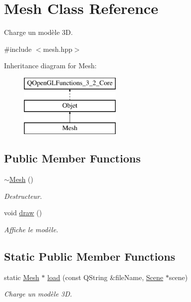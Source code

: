 \hypertarget{class_mesh}{\section{Mesh Class Reference}
\label{class_mesh}
}


Charge un modèle 3\+D.  




{\ttfamily \#include $<$mesh.\+hpp$>$}

Inheritance diagram for Mesh\+:\begin{figure}[H]
\begin{center}
\leavevmode
\includegraphics[height=3.000000cm]{class_mesh}
\end{center}
\end{figure}
\subsection*{Public Member Functions}
\begin{DoxyCompactItemize}
\item 
\hyperlink{class_mesh_a5efe4da1a4c0971cfb037bd70304c303}{$\sim$\+Mesh} ()
\begin{DoxyCompactList}\small\item\em Destructeur. \end{DoxyCompactList}\item 
void \hyperlink{class_mesh_a996a8668fa2ca7d95d6d10744c833bc8}{draw} ()
\begin{DoxyCompactList}\small\item\em Affiche le modèle. \end{DoxyCompactList}\end{DoxyCompactItemize}
\subsection*{Static Public Member Functions}
\begin{DoxyCompactItemize}
\item 
static \hyperlink{class_mesh}{Mesh} $\ast$ \hyperlink{class_mesh_ab930df3a124420d74b954948bb6bfbec}{load} (const Q\+String \&file\+Name, \hyperlink{class_scene}{Scene} $\ast$scene)
\begin{DoxyCompactList}\small\item\em Charge un modèle 3\+D. \end{DoxyCompactList}\end{DoxyCompactItemize}
